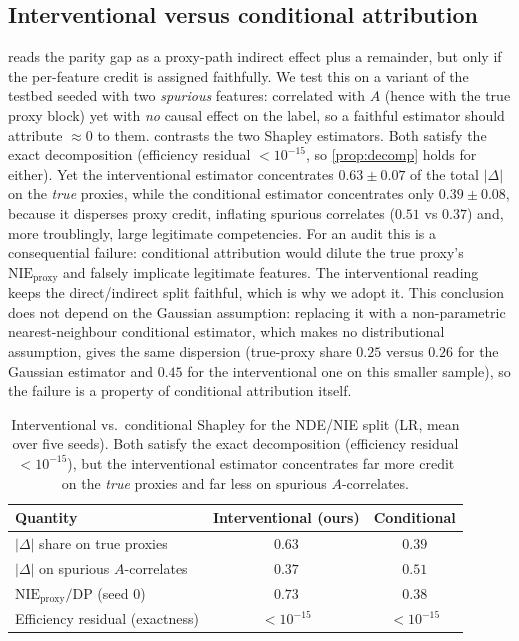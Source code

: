 \documentclass[sn-mathphys-num]{sn-jnl}
\newcommand{\DP}{\mathrm{DP}}
\begin{document}
\subsection{Interventional versus conditional attribution}
\label{sec:results-mediation}
 reads the parity gap as a proxy-path indirect effect plus a
remainder, but only if the per-feature credit is assigned faithfully. We test
this on a variant of the testbed seeded with two \emph{spurious} features:
correlated with $A$ (hence with the true proxy block) yet with \emph{no} causal
effect on the label, so a faithful estimator should attribute $\approx0$ to them.
 contrasts the two Shapley estimators. Both satisfy the exact
decomposition (efficiency residual $<10^{-15}$, so \cref{prop:decomp} holds for
either). Yet the interventional estimator concentrates $0.63\pm0.07$ of the total
$|\Delta|$ on the \emph{true} proxies, while the conditional estimator concentrates
only $0.39\pm0.08$, because it disperses proxy credit, inflating spurious correlates
($0.51$ vs $0.37$) and, more troublingly, large legitimate competencies. For an
audit this is a consequential failure: conditional attribution would dilute the
true proxy's $\text{NIE}_{\text{proxy}}$ and falsely implicate legitimate features.
The interventional reading keeps the direct/indirect split faithful, which is why
we adopt it. This conclusion does not depend on the Gaussian assumption: replacing
it with a non-parametric nearest-neighbour conditional estimator, which makes no
distributional assumption, gives the same dispersion (true-proxy share $0.25$
versus $0.26$ for the Gaussian estimator and $0.45$ for the interventional one on
this smaller sample), so the failure is a property of conditional attribution
itself.

\begin{table}[tbp]
\centering
\caption{Interventional vs.\ conditional Shapley for the NDE/NIE split (LR, mean
over five seeds). Both satisfy the exact decomposition (efficiency residual
$<10^{-15}$), but the interventional estimator concentrates far more credit on the
\emph{true} proxies and far less on spurious $A$-correlates.}
\label{tab:mediation}
\small
\begin{tabular}{lcc}
\toprule
Quantity & Interventional (ours) & Conditional\\
\midrule
$|\Delta|$ share on true proxies & $\mathbf{0.63}$ & $0.39$\\
$|\Delta|$ on spurious $A$-correlates & $\mathbf{0.37}$ & $0.51$\\
$\text{NIE}_{\text{proxy}}/\DP$ (seed 0) & $0.73$ & $0.38$\\
Efficiency residual (exactness) & $<10^{-15}$ & $<10^{-15}$\\
\bottomrule
\end{tabular}
\end{table}
\end{document}
